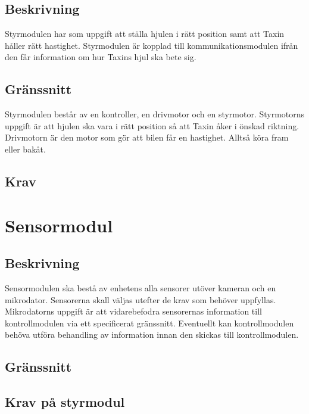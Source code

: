 \documentclass[kravspec/krav.tex]{subfiles}
\begin{document}
\subsection{Beskrivning}
Styrmodulen har som uppgift att ställa hjulen i rätt position samt att Taxin håller rätt hastighet. Styrmodulen är kopplad till kommunikationsmodulen ifrån den får information om hur Taxins hjul ska bete sig.
\subsection{Gränssnitt}
Styrmodulen består av en kontroller, en drivmotor och en styrmotor. Styrmotorns uppgift är att hjulen ska vara i rätt position så att Taxin åker i önskad riktning. Drivmotorn är den motor som gör att bilen får en hastighet. Alltså köra fram eller bakåt.
\subsection{Krav}
\begin{reqlist}
    \req{}
\end{reqlist}
\clearpage
\section{Sensormodul}
\subsection{Beskrivning}
Sensormodulen ska bestå av enhetens alla sensorer utöver kameran och en
mikrodator. Sensorerna skall väljas utefter de krav som behöver uppfyllas.
Mikrodatorns uppgift är att vidarebefodra sensorernas information till
kontrollmodulen via ett specificerat gränssnitt. Eventuellt kan kontrollmodulen
behöva utföra behandling av information innan den skickas till kontrollmodulen.

\subsection{Gränssnitt}
\subsection{Krav på styrmodul}
\end{document}
